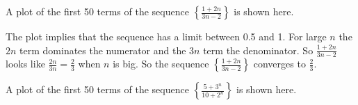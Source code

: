 \begin{activitySolution}
\ba
	\item A plot of the first 50 terms of the sequence $\left\{\frac{1+2n}{3n-2}\right\}$ is shown here.
\begin{center}  \end{center}
The plot implies that the sequence has a limit between 0.5 and 1. For large $n$ the $2n$ term dominates the numerator and the $3n$ term the denominator. So $\frac{1+2n}{3n-2}$ looks like $\frac{2n}{3n} = \frac{2}{3}$ when $n$ is big. So the sequence $\left\{\frac{1+2n}{3n-2}\right\}$ converges to $\frac{2}{3}$.
    \item A plot of the first 50 terms of the sequence $\left\{\frac{5+3^n}{10+2^n}\right\}$ is shown here.

\end{activitySolution}
